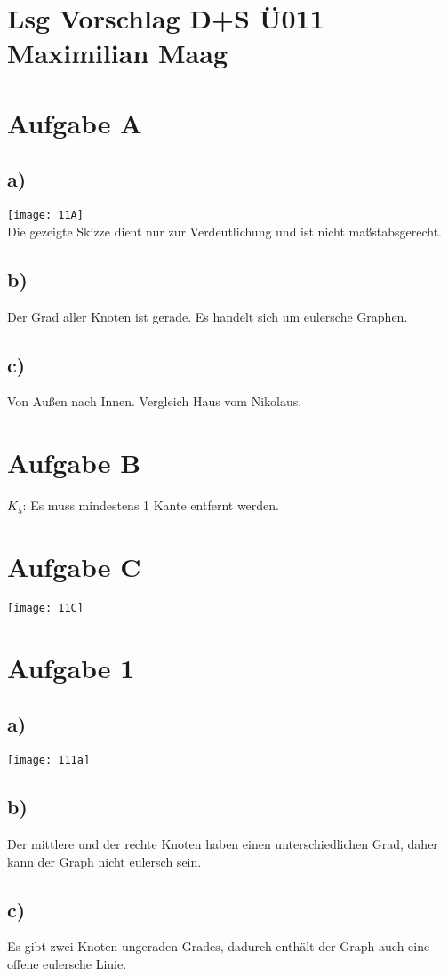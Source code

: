 \documentclass{article}
\begin{document}
	\section*{Lsg Vorschlag D+S Ü011 Maximilian Maag}
	\section*{Aufgabe A}
	\subsection*{a)}
	\texttt{[image: 11A]} \\
	Die gezeigte Skizze dient nur zur Verdeutlichung und ist nicht maßstabsgerecht.
	\subsection*{b)}
	Der Grad aller Knoten ist gerade. Es handelt sich um eulersche Graphen.
	\subsection*{c)}
	Von Außen nach Innen. Vergleich Haus vom Nikolaus.
	\section*{Aufgabe B}
	$K_5$: Es muss mindestens 1 Kante entfernt werden. \\
	
	\section*{Aufgabe C}
	\texttt{[image: 11C]}
	\section*{Aufgabe 1}
	\subsection*{a)}
	\texttt{[image: 111a]}
	\subsection*{b)}
	Der mittlere und der rechte Knoten haben einen unterschiedlichen Grad, daher kann der Graph nicht eulersch sein.
	\subsection*{c)}
	Es gibt zwei Knoten ungeraden Grades, dadurch enthält der Graph auch eine offene eulersche Linie.
	
\end{document}
